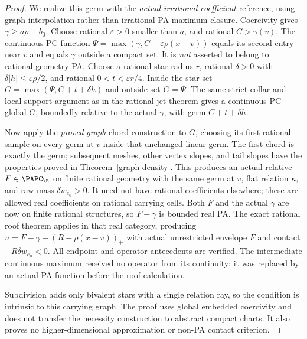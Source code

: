 \begin{proof}
We realize this germ with the \emph{actual irrational-coefficient}
reference, using graph interpolation rather than irrational PA maximum
closure. Coercivity gives $\gamma\geq a\rho-b_0$. Choose rational
$\varepsilon>0$ smaller than $a$, and rational $C>\gamma(v)$.
The continuous PC function
$\Psi=\max(\gamma,C+\varepsilon\rho(x-v))$ equals its second entry
near $v$ and equals $\gamma$ outside a compact set. It is \emph{not}
asserted to belong to rational-geometry PA. Choose a rational star
radius $r$, rational $\delta>0$ with $\delta|h|\leq\varepsilon\rho/2$,
and rational $0<t<\varepsilon r/4$.
Inside the star set $G=\max(\Psi,C+t+\delta h)$ and outside set $G=\Psi$.
The same strict collar and local-support argument as in the rational
jet theorem gives a continuous PC global $G$, boundedly relative to
the actual $\gamma$, with germ $C+t+\delta h$.

Now apply the \emph{proved graph} chord construction to $G$, choosing
its first rational sample on every germ at $v$ inside that unchanged
linear germ. The first chord is exactly the germ; subsequent meshes,
other vertex slopes, and tail slopes have the properties proved in
Theorem~\ref{graph-density}. This produces an actual relative
$F\in\PAPC_\R$ on finite rational geometry with the same germ at $v$,
flat relation $\kappa$, and raw mass $\delta w_{e_0}>0$.
It need not have rational coefficients elsewhere; these are allowed
real coefficients on rational carrying cells. Both $F$ and the actual
$\gamma$ are now on finite rational structures, so $F-\gamma$ is
bounded real PA. The exact rational roof theorem applies in that real
category, producing $u=F-\gamma+(R-\rho(x-v))_+$ with actual
unrestricted envelope $F$ and contact $-R\delta w_{e_0}<0$.
All endpoint and operator antecedents are verified. The intermediate
continuous maximum received no operator from its continuity; it was
replaced by an actual PA function before the roof calculation.

Subdivision adds only bivalent stars with a single relation ray, so the
condition is intrinsic to this carrying graph. The proof uses global
embedded coercivity and does not transfer the necessity construction
to abstract compact charts. It also proves no higher-dimensional
approximation or non-PA contact criterion.
\end{proof}
